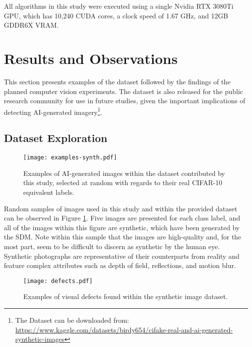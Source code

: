 \documentclass{article}
\begin{document}
All algorithms in this study were executed using a single Nvidia RTX 3080Ti GPU, which has 10,240 CUDA cores, a clock speed of 1.67 GHz, and 12GB GDDR6X VRAM. 



\section{Results and Observations}
\label{sec:results}
This section presents examples of the dataset followed by the findings of the planned computer vision experiments. The dataset is also released for the public research community for use in future studies, given the important implications of detecting AI-generated imagery\footnote{The Dataset can be downloaded from: \\\url{https://www.kaggle.com/datasets/birdy654/cifake-real-and-ai-generated-synthetic-images}}.

\subsection{Dataset Exploration}

\begin{figure}
    \centering
    \texttt{[image: examples-synth.pdf]}
    \caption{Examples of AI-generated images within the dataset contributed by this study, selected at random with regards to their real CIFAR-10 equivalent labels.}
    \label{fig:examples-synth}
\end{figure}

Random samples of images used in this study and within the provided dataset can be observed in Figure \ref{fig:examples-synth}. Five images are presented for each class label, and all of the images within this figure are synthetic, which have been generated by the SDM. Note within this sample that the images are high-quality and, for the most part, seem to be difficult to discern as synthetic by the human eye. Synthetic photographs are representative of their counterparts from reality and feature complex attributes such as depth of field, reflections, and motion blur. 


\begin{figure}
    \centering
    \texttt{[image: defects.pdf]}
    \caption{Examples of visual defects found within the synthetic image dataset.}
    \label{fig:defects}
\end{figure}
\end{document}
